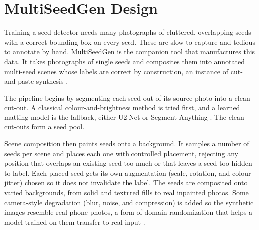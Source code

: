 \clearpage
{}
\clearpage

\clearpage
{}
\clearpage

\clearpage
{}
\clearpage

\clearpage
{}
\clearpage

\clearpage
{}
\clearpage

\clearpage
{}
\clearpage

\section{MultiSeedGen Design}

Training a seed detector needs many photographs of cluttered, overlapping seeds
with a correct bounding box on every seed. These are slow to capture and tedious
to annotate by hand. MultiSeedGen is the companion tool that manufactures this
data. It takes photographs of single seeds and composites them into annotated
multi-seed scenes whose labels are correct by construction, an instance of
cut-and-paste synthesis \cite{dwibedi2017cutpaste}.

The pipeline begins by segmenting each seed out of its source photo into a clean
cut-out. A classical colour-and-brightness method is tried first, and a learned
matting model is the fallback, either U2-Net \cite{qin2020u2net} or Segment
Anything \cite{kirillov2023sam}. The clean cut-outs form a seed pool.

Scene composition then paints seeds onto a background. It samples a number of
seeds per scene and places each one with controlled placement, rejecting any
position that overlaps an existing seed too much or that leaves a seed too hidden
to label. Each placed seed gets its own augmentation (scale, rotation, and colour
jitter) chosen so it does not invalidate the label. The seeds are composited onto
varied backgrounds, from solid and textured fills to real inpainted photos. Some
camera-style degradation (blur, noise, and compression) is added so the synthetic
images resemble real phone photos, a form of domain randomization that helps a
model trained on them transfer to real input
\cite{tobin2017domainrand,shorten2019augmentation}.

